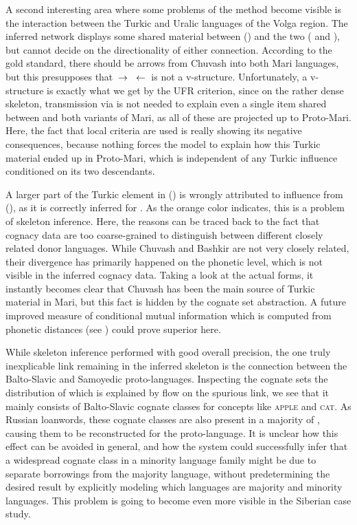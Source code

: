  A second interesting area where some problems of the method become visible is the interaction between the Turkic and Uralic languages of the Volga region. The inferred network displays some shared material between  () and the two  ( and ), but cannot decide on the directionality of either connection. According to the gold standard, there should be arrows from Chuvash into both Mari languages, but this presupposes that  $\kern 2pt\hbox{$\rightarrow$}\kern 2pt$  $\kern 2pt\hbox{$\leftarrow$}\kern 2pt$  is not a v-structure. Unfortunately, a v-structure is exactly what we get by the UFR criterion, since on the rather dense skeleton, transmission via  is not needed to explain even a single item shared between  and both variants of Mari, as all of these are projected up to Proto-Mari. Here, the fact that local criteria are used is really showing its negative consequences, because nothing forces the model to explain how this Turkic material ended up in Proto-Mari, which is independent of any Turkic influence conditioned on its two descendants.
 
 A larger part of the Turkic element in  () is wrongly attributed to influence from  (), as it is correctly inferred for . As the orange color indicates, this is a problem of skeleton inference. Here, the reasons can be traced back to the fact that cognacy data are too coarse-grained to distinguish between different closely related donor languages. While Chuvash and Bashkir are not very closely related, their divergence has primarily happened on the phonetic level, which is not visible in the inferred cognacy data. Taking a look at the actual forms, it instantly becomes clear that Chuvash has been the main source of Turkic material in Mari, but this fact is hidden by the cognate set abstraction. A future improved measure of conditional mutual information which is computed from phonetic distances (see ) could prove superior here.
 
 While skeleton inference performed with good overall precision, the one truly inexplicable link remaining in the inferred skeleton is the connection between the Balto-Slavic and Samoyedic proto-languages. Inspecting the cognate sets the distribution of which is explained by flow on the spurious link, we see that it mainly consists of Balto-Slavic cognate classes for concepts like \textsc{apple} and \textsc{cat}. As Russian loanwords, these cognate classes are also present in a majority of , causing them to be reconstructed for the proto-language. It is unclear how this effect can be avoided in general, and how the system could successfully infer that a widespread cognate class in a minority language family might be due to separate borrowings from the majority language, without predetermining the desired result by explicitly modeling which languages are majority and minority languages. This problem is going to become even more visible in the Siberian case study.
 

